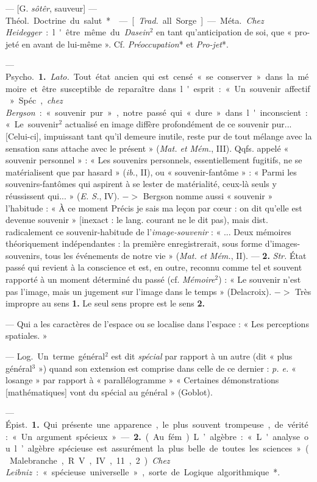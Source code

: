 \begin{itemize}[leftmargin=1cm, label=, itemsep=1pt]
 — [G. {\it sôtêr}, sauveur] —
\si{Théol.} Doctrine du salut*.

 — [{\it Trad.} all. Sorge] — \si{Méta.} {\it Chez Heidegger} :
l'être même du {\it Dasein}$^2$ en tant qu’anticipation de soi, que
« pro-jeté en avant de lui-même ». Cf. {\it Préoccupation}* et {\it Pro-jet}*.

 — \si{Psycho.} {\bf 1.} {\it Lato.} Tout état ancien qui est
censé « se conserver » dans la mémoire et être susceptible de reparaître dans
l'esprit : « Un souvenir affectif » Spéc., {\it chez Bergson} : « souvenir
pur », notre passé qui « dure » dans l'inconscient : « Le souvenir$^2$
actualisé en image diffère profondément de ce souvenir pur... [Celui-ci],
impuissant tant qu'il demeure inutile, reste pur de tout mélange avec la
sensation sans attache avec le présent »
({\it Mat. et Mém.}, III). Qqfs. appelé « souvenir personnel » : « Les
souvenirs personnels, essentiellement fugitifs, ne se matérialisent que par
hasard » ({\it ib.}, II), ou « souvenir-fantôme » : « Parmi les
souvenirs-fantômes qui aspirent à se lester de matérialité, ceux-là seuls y
réussissent qui... » ({\it E. S.}, IV). $->$ Bergson nomme aussi « souvenir »
l'habitude : « À ce moment Précis je sais ma leçon par cœur : on dit qu’elle
est devenue souvenir » [inexact : le lang. courant ne le dit pas), mais dist.
radicalement ce souvenir-habitude de l'{\it image-souvenir} : « ... Deux
mémoires théoriquement indépendantes : la première enregistrerait, sous forme
d’images-souvenirs, tous les événements de notre vie » ({\it Mat. et Mém.},
II). — {\bf 2.} {\it Str.} État passé qui revient à la conscience et est, en
outre, reconnu comme tel et souvent rapporté à un moment déterminé du passé
(cf. {\it Mémoire}$^2$) : « Le souvenir n’est pas l’image, mais un jugement
sur l’image dans le temps » (Delacroix). $->$ Très impropre au sens {\bf 1.}
Le seul sens propre est le sens {\bf 2.}

 — Qui a les caractères de l’espace ou se localise dans
l’espace : « Les perceptions spatiales. »

 — \si{Log.} Un terme général$^2$ est dit {\it spécial} par
rapport à un autre (dit « plus général$^3$ ») quand son extension est
comprise dans celle de ce dernier : {\it p. e.} « losange » par rapport à «
parallélogramme » « Certaines démonstrations [mathématiques] vont du spécial
au général » (Goblot).

 — \si{Épist.} {\bf 1.} Qui présente une apparence, le plus
souvent trompeuse, de vérité : « Un argument spécieux ». — {\bf 2.} (Au
fém.). L’algèbre :
« L'analyse ou l’algèbre spécieuse est assurément la plus belle de toutes les
sciences » (Malebranche, R. V., IV, 11, 2). {\it Chez Leibniz} : « spécieuse
universelle », sorte de Logique algorithmique*.


\end{itemize}
